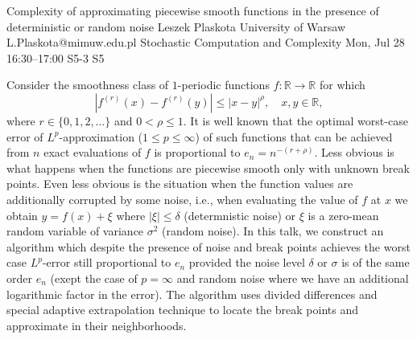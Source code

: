 \documentclass[12pt,lettersize,oneside]{book} %
\begin{document}
\begin{talk}
  {Complexity of approximating piecewise smooth functions in the presence of deterministic or random noise}%
  {Leszek Plaskota}%
  {University of Warsaw}%
  {L.Plaskota@mimuw.edu.pl}%
  {Stochastic Computation and Complexity}%
  {}%
  {Mon, Jul 28 16:30--17:00}%
  {S5-3}%
  {S5}%
    
   
Consider the smoothness class of $1$-periodic functions $f:\mathbb R\to\mathbb R$ for which 
$$|f^{(r)}(x)-f^{(r)}(y)|\le |x-y|^\rho,\quad x,y\in\mathbb R,$$ 
where $r\in\{0,1,2,\ldots\}$ and $0<\rho\le 1.$ It is well known that the optimal worst-case error of $L^p$-approximation ($1\le p\le\infty$) of such functions that can be achieved from $n$ exact evaluations of $f$ is proportional to $e_n=n^{-(r+\rho)}.$ Less obvious is what happens when the functions are piecewise smooth only with unknown break points. Even less obvious is the situation when the function values are additionally corrupted by some noise, i.e., when evaluating the value of $f$ at $x$ we obtain $y=f(x)+\xi$ where $|\xi|\le\delta$ (determnistic noise) or $\xi$ is a zero-mean random variable of variance $\sigma^2$ (random noise). In this talk, we construct an algorithm which despite the presence of noise and break points achieves the worst case $L^p$-error still proportional to $e_n$ provided the noise level $\delta$ or $\sigma$ is of the same order $e_n$ (exept the case of $p=\infty$ and random noise where we have an additional logarithmic factor in the error). The algorithm uses divided differences and special adaptive extrapolation technique to locate the break points and approximate in their neighborhoods. 

\end{talk}
\end{document}
